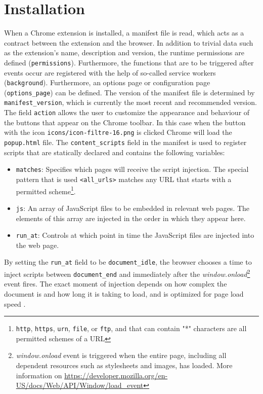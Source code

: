 \section{Installation}
When a Chrome extension is installed, a manifest file is read, which acts as a contract between the extension and the browser. In addition to trivial data such as the extension's name, description and version, the runtime permissions are defined (\texttt{permissions}). Furthermore, the functions that are to be triggered after events occur are registered with the help of so-called service workers (\texttt{background}). Furthermore, an options page or configuration page (\verb;options_page;) can be defined. The version of the manifest file is determined by \verb;manifest_version;, which is currently the most recent and recommended version. The field \texttt{action} allows the user to customize the appearance and behaviour of the buttons that appear on the Chrome toolbar. In this case when the button with the icon \texttt{icons/icon-filtre-16.png} is clicked Chrome will load the \texttt{popup.html} file. The \verb;content_scripts; field in the manifest is used to register scripts that are statically declared and contains the following variables:

\begin{itemize}
  \item \texttt{matches}: Specifies which pages will receive the script injection. The special pattern that is used \verb;<all_urls>; matches any URL that starts with a permitted scheme\footnote{\texttt{http}, \texttt{https}, \texttt{urn}, \texttt{file}, or \texttt{ftp}, and that can contain "*" characters are all permitted schemes of a URL}.
  \item \texttt{js}: An array of JavaScript files to be embedded in relevant web pages. The elements of this array are injected in the order in which they appear here.
  \item \verb;run_at;: Controls at which point in time the JavaScript files are injected into the web page.
\end{itemize}

By setting the \verb;run_at; field to be \verb;document_idle;, the browser chooses a time to inject scripts between \verb;document_end; and immediately after the \emph{window.onload}\footnote{\emph{window.onload} event is triggered when the entire page, including all dependent resources such as stylesheets and images, has loaded. More information on \url{https://developer.mozilla.org/en-US/docs/Web/API/Window/load_event}} event fires. The exact moment of injection depends on how complex the document is and how long it is taking to load, and is optimized for page load speed \autocite{chrome2021runtime}.

